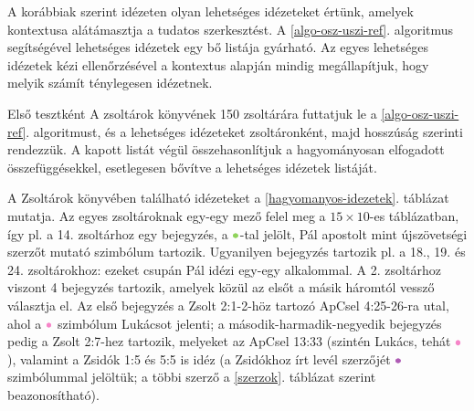 \documentclass{article}
\newcommand\Luke{{\color{Lavender}\bullet}\mathllap{\color{Lavender}\circ}}
\newcommand\Paul{{\color{YellowGreen}\bullet}\mathllap{\color{YellowGreen}\circ}}
\newcommand\Unknown{{\color{Orchid}\bullet}\mathllap{\color{Orchid}\circ}}
\begin{document}



A korábbiak szerint idézeten olyan lehetséges idézeteket értünk,
amelyek kontextusa alátámasztja a tudatos szerkesztést.
A \ref{algo-osz-uszi-ref}. algoritmus segítségével lehetséges idézetek egy bő listája gyárható.
Az egyes lehetséges idézetek kézi ellenőrzésével a kontextus alapján mindig megállapítjuk,
hogy melyik számít ténylegesen idézetnek.

Első tesztként A zsoltárok könyvének 150 zsoltárára futtatjuk le a \ref{algo-osz-uszi-ref}. algoritmust,
és a lehetséges idézeteket zsoltáronként, majd hosszúság szerinti rendezzük.
A kapott listát végül összehasonlítjuk a hagyományosan elfogadott összefüggésekkel,
esetlegesen bővítve a lehetséges idézetek listáját.

A Zsoltárok könyvében található idézeteket a \ref{hagyomanyos-idezetek}. táblázat mutatja. Az
egyes zsoltároknak egy-egy mező felel meg a $15\times10$-es táblázatban, így pl. a 14. zsoltárhoz
egy bejegyzés, a $\Paul$-tal jelölt, Pál apostolt mint újszövetségi szerzőt mutató szimbólum tartozik.
Ugyanilyen bejegyzés tartozik pl. a 18., 19. és 24. zsoltárokhoz: ezeket csupán Pál idézi egy-egy
alkalommal. A 2. zsoltárhoz viszont 4 bejegyzés tartozik, amelyek közül az elsőt a másik háromtól
vessző választja el. Az első bejegyzés a Zsolt 2:1-2-höz tartozó ApCsel 4:25-26-ra utal, ahol
a $\Luke$ szimbólum Lukácsot jelenti; a második-harmadik-negyedik bejegyzés pedig a Zsolt 2:7-hez
tartozik, melyeket az ApCsel 13:33 (szintén Lukács, tehát $\Luke$), valamint a Zsidók 1:5 és 5:5 is
idéz (a Zsidókhoz írt levél szerzőjét $\Unknown$ szimbólummal jelöltük; a többi szerző
a \ref{szerzok}. táblázat szerint beazonosítható).
\end{document}
